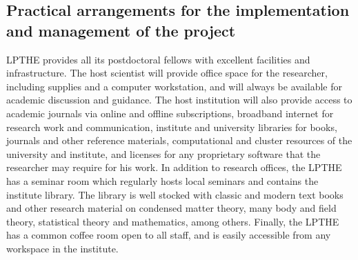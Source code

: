 \documentclass[a4paper,11pt,color]{article}
\begin{document}
\subsection{Practical arrangements for the implementation and
  management of the project}
\label{sec:impl_management}
 {LPTHE provides all its postdoctoral fellows with excellent facilities and infrastructure. The host scientist will provide office space for the researcher, including supplies and a computer workstation, and will always be available for academic discussion and guidance. The host institution will also provide access to academic journals via online and offline subscriptions, broadband internet for research work and communication, institute and university libraries for books, journals and other reference materials, computational and cluster resources of the university and institute, and licenses for any proprietary software that the researcher may require for his work. In addition to research offices, the LPTHE has a seminar room which regularly hosts local seminars and contains the institute library. The library is well stocked with classic and modern text books and other research material on condensed matter theory, many body and field theory, statistical theory and mathematics, among others. 
Finally, the LPTHE has a common coffee room open to all staff, and is easily accessible from any workspace in the institute.}
\end{document}
